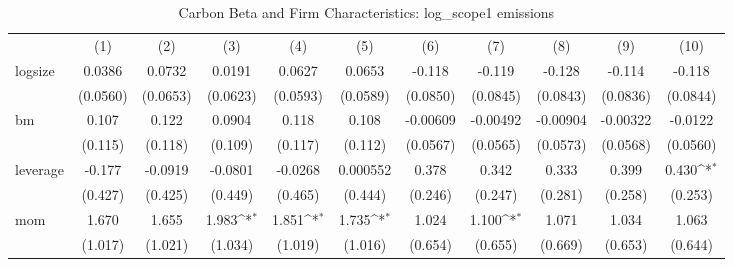 \begin{table}[htbp]\centering
\def\sym#1{\ifmmode^{#1}\else\(^{#1}\)\fi}
\caption{Carbon Beta and Firm Characteristics: log\_scope1 emissions}
\begin{tabular}{l*{10}{c}}
                &\multicolumn{1}{c}{(1)}         &\multicolumn{1}{c}{(2)}         &\multicolumn{1}{c}{(3)}         &\multicolumn{1}{c}{(4)}         &\multicolumn{1}{c}{(5)}         &\multicolumn{1}{c}{(6)}         &\multicolumn{1}{c}{(7)}         &\multicolumn{1}{c}{(8)}         &\multicolumn{1}{c}{(9)}         &\multicolumn{1}{c}{(10)}         \\
logsize         &   0.0386         &   0.0732         &   0.0191         &   0.0627         &   0.0653         &   -0.118         &   -0.119         &   -0.128         &   -0.114         &   -0.118         \\
                & (0.0560)         & (0.0653)         & (0.0623)         & (0.0593)         & (0.0589)         & (0.0850)         & (0.0845)         & (0.0843)         & (0.0836)         & (0.0844)         \\
bm              &    0.107         &    0.122         &   0.0904         &    0.118         &    0.108         & -0.00609         & -0.00492         & -0.00904         & -0.00322         &  -0.0122         \\
                &  (0.115)         &  (0.118)         &  (0.109)         &  (0.117)         &  (0.112)         & (0.0567)         & (0.0565)         & (0.0573)         & (0.0568)         & (0.0560)         \\
leverage        &   -0.177         &  -0.0919         &  -0.0801         &  -0.0268         & 0.000552         &    0.378         &    0.342         &    0.333         &    0.399         &    0.430\sym{*}  \\
                &  (0.427)         &  (0.425)         &  (0.449)         &  (0.465)         &  (0.444)         &  (0.246)         &  (0.247)         &  (0.281)         &  (0.258)         &  (0.253)         \\
mom             &    1.670         &    1.655         &    1.983\sym{*}  &    1.851\sym{*}  &    1.735\sym{*}  &    1.024         &    1.100\sym{*}  &    1.071         &    1.034         &    1.063         \\
                &  (1.017)         &  (1.021)         &  (1.034)         &  (1.019)         &  (1.016)         &  (0.654)         &  (0.655)         &  (0.669)         &  (0.653)         &  (0.644)         \\

\end{tabular}
\end{table}
